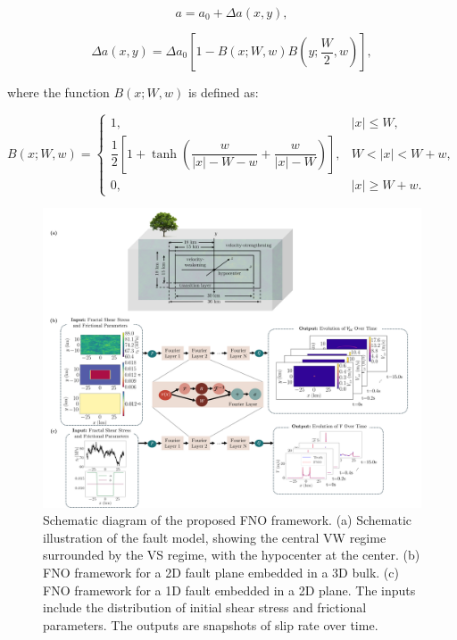 \documentclass[draft]{agujournal2019}
\begin{document}
\begin{equation}
a = a_{0} + \Delta a(x,y),
\end{equation}

\begin{equation}
\Delta a(x, y) = \Delta a_0 \left[ 1 - B(x; W, w) B\left(y; \frac{W}{2}, w\right) \right],
\end{equation}

where the function \(B(x; W, w)\) is defined as:

\begin{equation}
B(x; W, w) =
\begin{cases}
1, & |x| \leq W, \\
\dfrac{1}{2} \left[ 1 + \tanh\left( \dfrac{w}{|x| - W - w} + \dfrac{w}{|x| - W} \right) \right], & W < |x| < W + w, \\
0, & |x| \geq W + w.
\end{cases}
\end{equation}


\begin{figure}
\centering
\includegraphics[width=1.0\linewidth]{FNO_framework6.png}
\caption{\label{fig:schematic_FNO}Schematic diagram of the proposed FNO framework. (a) Schematic illustration of the fault model, showing the central VW regime surrounded by the VS regime, with the hypocenter at the center. (b) FNO framework for a 2D fault plane embedded in a 3D bulk. (c) FNO framework for a 1D fault embedded in a 2D plane. The inputs include the distribution of initial shear stress and frictional parameters. The outputs are snapshots of slip rate over time.
}
\end{figure}
\end{document}
